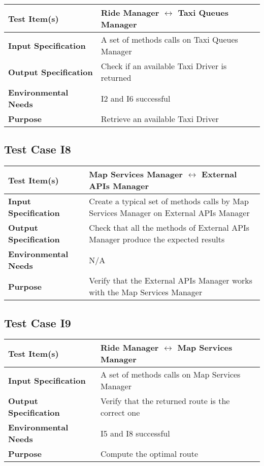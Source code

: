          	\begin{tabular}{p{} p{}}
         		\hline
         		\textbf{Test Item(s)} & Ride Manager $ \longleftrightarrow $ Taxi Queues Manager  \\
         		\hline
         		\textbf{Input Specification} & A set of methods calls on Taxi Queues Manager \\
         		\hline
         		\textbf{Output Specification} & Check if an available Taxi Driver is returned\\
         		\hline
         		\textbf{Environmental Needs} &  I2 and I6 successful\\
         		\hline
         		\textbf{Purpose} & Retrieve an available Taxi Driver \\
         		\hline
         	\end{tabular}
         
   
    \subsection{Test Case I8}
    
    	\begin{tabular}{p{} p{}}
    		\hline
    		\textbf{Test Item(s)} & Map Services Manager $ \longleftrightarrow $ External APIs Manager  \\
    		\hline
    		\textbf{Input Specification} & Create a typical set of methods calls by Map Services Manager on External APIs Manager\\
    		\hline
    		\textbf{Output Specification} & Check that all the methods of External APIs Manager produce the expected results\\
    		\hline
    		\textbf{Environmental Needs} &  N/A\\
    		\hline
    		\textbf{Purpose} & Verify that the External APIs Manager works with the Map Services Manager \\
    		\hline
    	\end{tabular}
    
    
         
   \subsection{Test Case I9}
   
   	\begin{tabular}{p{} p{}}
   		\hline
   		\textbf{Test Item(s)} & Ride Manager $ \longleftrightarrow $ Map Services Manager  \\
   		\hline
   		\textbf{Input Specification} & A set of methods calls on Map Services Manager\\
   		\hline
   		\textbf{Output Specification} & Verify that the returned route is the correct one\\
   		\hline
   		\textbf{Environmental Needs} &  I5 and I8 successful\\
   		\hline
   		\textbf{Purpose} & Compute the optimal route \\
   		\hline
   	\end{tabular}
   

